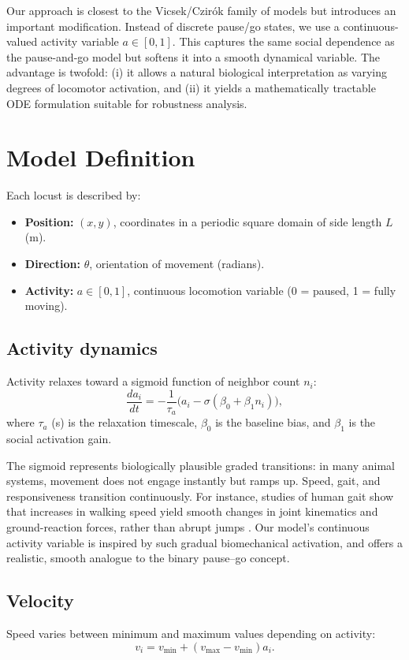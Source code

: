 \documentclass[11pt,a4paper]{article}
\begin{document}
Our approach is closest to the Vicsek/Czirók family of models but introduces an important modification. Instead of discrete pause/go states, we use a continuous-valued activity variable $a \in [0,1]$. This captures the same social dependence as the pause-and-go model but softens it into a smooth dynamical variable. The advantage is twofold: (i) it allows a natural biological interpretation as varying degrees of locomotor activation, and (ii) it yields a mathematically tractable ODE formulation suitable for robustness analysis.

\section{Model Definition}

Each locust is described by:
\begin{itemize}
    \item \textbf{Position:} $(x,y)$, coordinates in a periodic square domain of side length $L$ (m).
    \item \textbf{Direction:} $\theta$, orientation of movement (radians).
    \item \textbf{Activity:} $a \in [0,1]$, continuous locomotion variable (0 = paused, 1 = fully moving).
\end{itemize}

\subsection{Activity dynamics}
Activity relaxes toward a sigmoid function of neighbor count $n_i$:
\[
\frac{da_i}{dt} = -\frac{1}{\tau_a}\Big(a_i - \sigma(\beta_0 + \beta_1 n_i)\Big),
\]
where $\tau_a$ (s) is the relaxation timescale, $\beta_0$ is the baseline bias, and $\beta_1$ is the social activation gain.

The sigmoid represents biologically plausible graded transitions: in many animal systems, movement does not engage instantly but ramps up. Speed, gait, and responsiveness transition continuously. For instance, studies of human gait show that increases in walking speed yield smooth changes in joint kinematics and ground-reaction forces, rather than abrupt jumps \cite{fukuchi2019gait}. Our model's continuous activity variable is inspired by such gradual biomechanical activation, and offers a realistic, smooth analogue to the binary pause–go concept.


\subsection{Velocity}
Speed varies between minimum and maximum values depending on activity:
\[
v_i = v_{\min} + (v_{\max} - v_{\min}) a_i.
\]
\end{document}
